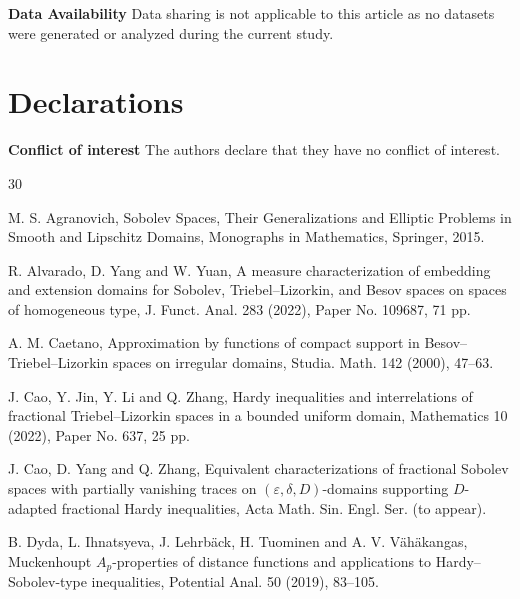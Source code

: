 \documentclass[11pt,twoside]{article}
\def\vez{\varepsilon}
\theoremstyle{mylem}
\theoremstyle{definition}
\numberwithin{equation}{section}
\begin{document}
\noindent\textbf{Data Availability}\quad
Data sharing is not applicable to this article
as no datasets were generated or analyzed during the current study.

\section*{Declarations}

\noindent\textbf{Conflict of interest}\quad
The authors declare
that they have no conflict of interest.


\begin{thebibliography}{30}

\vspace{-0.3cm}
M. S. Agranovich, Sobolev Spaces, Their Generalizations and Elliptic Problems in Smooth and Lipschitz Domains, Monographs in Mathematics, Springer, 2015.

\vspace{-0.3cm}
R. Alvarado, D. Yang and W. Yuan, A measure characterization of embedding and extension domains for Sobolev, Triebel--Lizorkin, and Besov spaces on spaces of homogeneous type, J. Funct. Anal. 283 (2022), Paper No. 109687, 71 pp.

\vspace{-0.3cm}
A. M. Caetano, Approximation by functions of compact support in Besov--Triebel--Lizorkin spaces on irregular domains, Studia. Math. 142 (2000), 47--63.

\vspace{-0.3cm}
J. Cao, Y. Jin, Y. Li and Q. Zhang, Hardy inequalities and interrelations of fractional Triebel--Lizorkin spaces in a bounded uniform domain, Mathematics 10 (2022), Paper No. 637, 25 pp.

\vspace{-0.3cm}
J. Cao, D. Yang and Q. Zhang, Equivalent characterizations of fractional Sobolev spaces with partially vanishing traces on $(\vez, \delta, D)$-domains supporting $
D$-adapted fractional Hardy inequalities, Acta Math. Sin. Engl. Ser. (to appear).


\vspace{-0.3cm}
B. Dyda, L. Ihnatsyeva, J. Lehrb\"{a}ck, H. Tuominen and A. V. V\"{a}h\"{a}kangas, Muckenhoupt $A_p$-properties of distance functions and applications to Hardy--Sobolev-type inequalities, Potential Anal. 50 (2019), 83--105.


\end{thebibliography}
\end{document}

